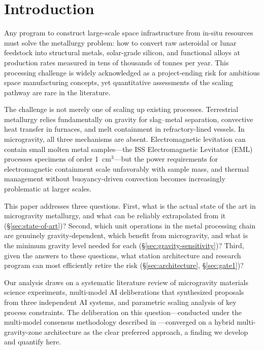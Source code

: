 \documentclass[preprint,12pt]{elsarticle}
\begin{document}
\linenumbers

\section{Introduction}
\label{sec:introduction}

Any program to construct large-scale space infrastructure from in-situ resources must solve the metallurgy problem: how to convert raw asteroidal or lunar feedstock into structural metals, solar-grade silicon, and functional alloys at production rates measured in tens of thousands of tonnes per year. This processing challenge is widely acknowledged as a project-ending risk for ambitious space manufacturing concepts, yet quantitative assessments of the scaling pathway are rare in the literature.

The challenge is not merely one of scaling up existing processes. Terrestrial metallurgy relies fundamentally on gravity for slag--metal separation, convective heat transfer in furnaces, and melt containment in refractory-lined vessels. In microgravity, all three mechanisms are absent. Electromagnetic levitation can contain small molten metal samples---the ISS Electromagnetic Levitator (EML) processes specimens of order 1~cm$^3$---but the power requirements for electromagnetic containment scale unfavorably with sample mass, and thermal management without buoyancy-driven convection becomes increasingly problematic at larger scales.

This paper addresses three questions. First, what is the actual state of the art in microgravity metallurgy, and what can be reliably extrapolated from it (\S\ref{sec:state-of-art})? Second, which unit operations in the metal processing chain are genuinely gravity-dependent, which benefit from microgravity, and what is the minimum gravity level needed for each (\S\ref{sec:gravity-sensitivity})? Third, given the answers to these questions, what station architecture and research program can most efficiently retire the risk (\S\ref{sec:architecture}, \S\ref{sec:gate1})?

Our analysis draws on a systematic literature review of microgravity materials science experiments, multi-model AI deliberations that synthesized proposals from three independent AI systems, and parametric scaling analysis of key process constraints. The deliberation on this question---conducted under the multi-model consensus methodology described in \cite{hakkenberg2026consensus}---converged on a hybrid multi-gravity-zone architecture as the clear preferred approach, a finding we develop and quantify here.
\end{document}
